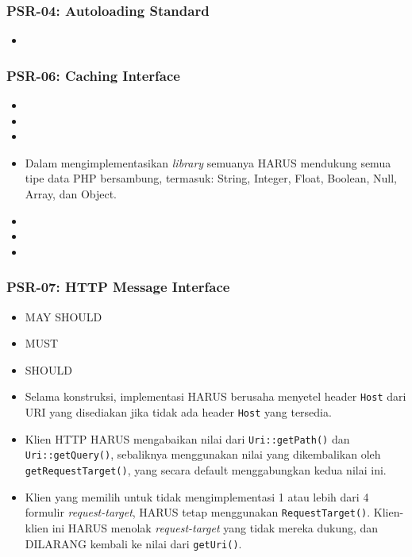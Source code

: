\subsubsection{PSR-04: Autoloading Standard}
\label{subsubsec:psr04}
\begin{itemize}
	\item
\end{itemize}

\subsubsection{PSR-06: Caching Interface}
\label{subsubsec:psr06}
\begin{itemize}
	\item
	\item
	\item 
	\item Dalam mengimplementasikan \textit{library} semuanya HARUS mendukung semua tipe data PHP bersambung, termasuk: String, Integer, Float, Boolean, Null, Array, dan Object.
	\item 
	\item 
	\item
\end{itemize}

\subsubsection{PSR-07: HTTP Message Interface}
\label{subsubsec:psr07}
\begin{itemize}
	\item MAY SHOULD
	\item MUST
	\item SHOULD
	\item Selama konstruksi, implementasi HARUS berusaha menyetel header  \verb|Host| dari URI yang disediakan jika tidak ada header \verb|Host| yang tersedia.
	\item Klien HTTP HARUS mengabaikan nilai dari \verb|Uri::getPath()| dan \verb|Uri::getQuery()|, sebaliknya menggunakan nilai yang dikembalikan oleh \verb|getRequestTarget()|, yang secara default menggabungkan kedua nilai ini.
	\item Klien yang memilih untuk tidak mengimplementasi 1 atau lebih dari 4 formulir \textit{request-target}, HARUS tetap menggunakan \verb|RequestTarget()|. Klien-klien ini HARUS menolak \textit{request-target} yang tidak mereka dukung, dan DILARANG kembali ke nilai dari \verb|getUri()|.
\end{itemize}

